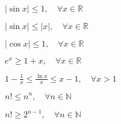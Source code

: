 



\everymath{\displaystyle}
\pagestyle{vangelis}



\setcounter{chapter}{1}

\begin{center}
    \minibox{\Large\bfseries \textcolor{Col1}{Απειροστικός Ι}}
\end{center}

\vspace{2\baselineskip}

\begin{minipage}[t]{0.45\textwidth}
    \minibox{\bfseries \large \textcolor{Col2}{Χρήσιμες Ανισότητες}}

\begin{myitemize}
    \item $|\sin x|\leq 1, \quad \forall x\in \mathbb{R}$
    \item $|\sin x|\leq |x|, \quad \forall x\in \mathbb{R}$
    \item $|\cos x|\leq 1, \quad \forall x\in \mathbb{R}$
    \item $e^x\geq 1+x, \quad \forall x\in \mathbb{R}$
    \item $1-\frac{1}{x}\leq \frac{\ln x}{x}\leq x-1, \quad \forall x>1$
    \item $n!\leq n^n, \quad \forall n\in \mathbb{N}$
    \item $n!\geq 2^{n-1}, \quad \forall n\in \mathbb{N}$
\end{myitemize}
\end{minipage}\hfill\begin{minipage}[t]{0.45\textwidth}

\minibox{\bfseries \large \textcolor{Col2}{Χρήσιμα Όρια Ακολουθιών}}


\end{minipage}
